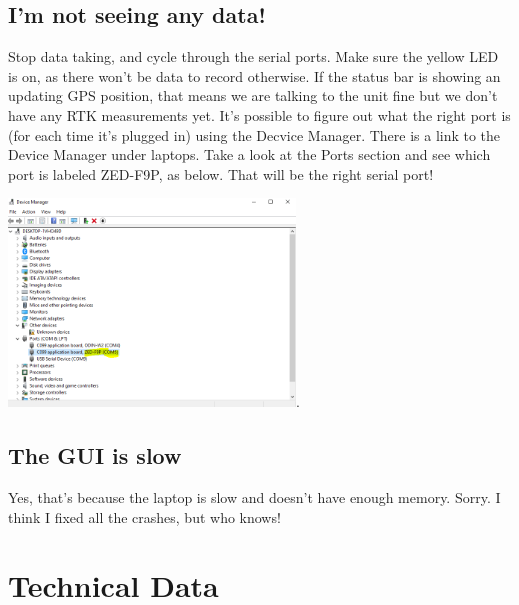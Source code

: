 \documentclass[usletter]{article}
\begin{document}
\subsection{I'm not seeing any data!}

Stop data taking, and cycle through the serial ports.  Make sure the yellow LED is on, as there  won't be  data to record otherwise. If the status bar is showing an updating GPS position, that means we are talking to the unit fine but we don't have any RTK measurements yet. 
It's possible to figure out what the right port is (for each time it's plugged in) using the Decvice Manager. There is a link to the Device Manager under laptops. Take a look at the Ports section and see which port is labeled ZED-F9P, as below. That will be the right serial port! 
\begin{center}
\includegraphics[width=3in]{device_manager}. 
\end{center}

\subsection{The GUI is slow} 

Yes, that's because the laptop is slow and doesn't have enough memory. Sorry. I think I fixed all the crashes, but who knows! 


\section{Technical Data} 
\end{document}
